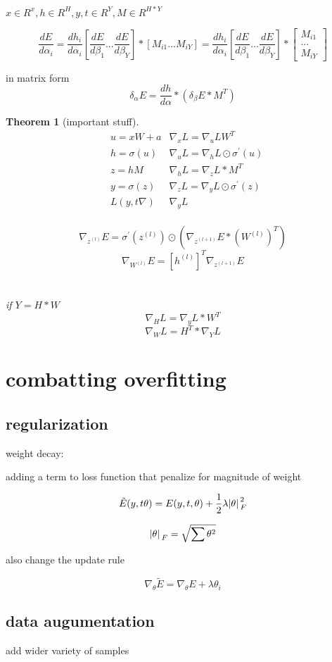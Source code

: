 \documentclass[10pt]{article}
\theoremstyle{break}
\newtheorem{thm}{Theorem}[subsection]
\begin{document}
$x\in R^x, h\in R^H, y,t\in R^Y, M\in R^{H*Y}$

$$\frac{dE}{d\alpha_i} = \frac{dh_i}{d\alpha_i}[\frac{dE}{d\beta_1}...\frac{dE}{d\beta_Y}]*[M_{i1}...M_{iY}] = \frac{dh_i}{d\alpha_i}[\frac{dE}{d\beta_1}...\frac{dE}{d\beta_Y}]*\begin{bmatrix}M_{i1}\\...\\M_{iY}\end{bmatrix}  $$

in matrix form 
$$\delta_\alpha E = \frac{dh}{d\alpha}* (\delta_\beta E* M^T)$$


\begin{thm}[important stuff]
\begin{align}
&u=xW+a&\nabla_xL=\nabla_u L W^T\\
&h=\sigma(u)&\nabla_uL=\nabla_hL\odot\sigma^{'}(u)\\
&z=hM&\nabla_hL=\nabla_zL*M^T\\
&y=\sigma(z)&\nabla_zL=\nabla_yL\odot \sigma^{'}(z)\\
&L(y,t\nabla)&\nabla_yL\\
\end{align}

$$\nabla_{z^(l)}E=\sigma^{'}(z^{(l)})\odot (\nabla_{z^{(l+1)}}E*(W^{(l)})^T)$$
$$\nabla_{W^{(l)}}E = [h^{(l)}]^T\nabla_{z^{(l+1)}}E$$
\\\\
if $Y=H*W$
$$\nabla_HL=\nabla_yL*W^T$$
$$\nabla_WL=H^T*\nabla_YL$$
   
\end{thm}

\section{combatting overfitting}
\subsection{regularization}
weight decay:

adding a term to loss function that penalize for magnitude of weight 

$$\tilde E(y,t\theta)=E(y,t,\theta)+\frac{1}{2}\lambda\abs*{\theta}_F^2$$

$$\abs*{\theta}_F = \sqrt{\sum \theta^2}$$

also change the update rule 

$$\nabla_\theta \tilde E = \nabla_\theta E + \lambda \theta_i$$

\subsection{data augumentation}
add wider variety of samples
\end{document}
